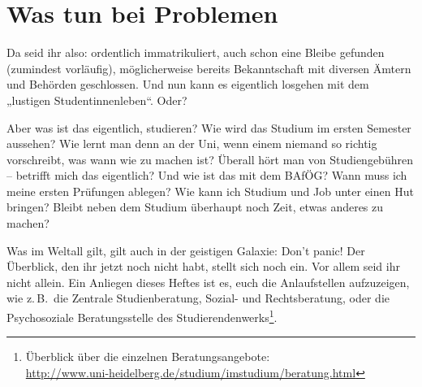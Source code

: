 \section{Was tun bei Problemen}
\label{dschungel}
Da seid ihr also: ordentlich immatrikuliert, auch schon eine Bleibe gefunden (zumindest vorläufig), möglicherweise bereits Bekanntschaft mit diversen Ämtern und Behörden geschlossen. Und nun kann es eigentlich losgehen mit dem „lustigen Studentinnenleben“. Oder?

Aber was ist das eigentlich, studieren? Wie wird das Studium im ersten Semester aussehen? Wie lernt man denn an der Uni, wenn einem niemand so richtig vorschreibt, was wann wie zu machen ist? Überall hört man von Studiengebühren -- betrifft mich das eigentlich? Und wie ist das mit dem BAfÖG? Wann muss ich meine ersten Prüfungen ablegen? Wie kann ich Studium und Job unter einen Hut bringen? Bleibt neben dem Studium überhaupt noch Zeit, etwas anderes zu machen?

Was im Weltall gilt, gilt auch in der geistigen Galaxie: Don't panic! Der Überblick, den ihr jetzt noch nicht habt, stellt sich noch ein. Vor allem seid ihr nicht allein. Ein Anliegen dieses Heftes ist es, euch die Anlaufstellen aufzuzeigen, wie z.\,B.\ die Zentrale Studienberatung, Sozial- und Rechtsberatung, oder die Psychosoziale Beratungsstelle des Studierendenwerks\footnote{Überblick über die einzelnen Beratungsangebote:\\\url{http://www.uni-heidelberg.de/studium/imstudium/beratung.html}}.


